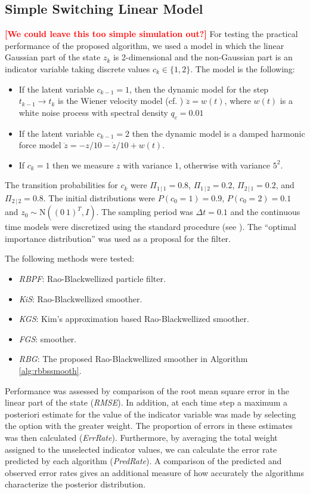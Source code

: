 \documentclass[twocolumn]{autart}    %
\newcommand{\comment}[1]{\textcolor{red}{\textbf{[#1]}}}
\begin{document}
\subsection{Simple Switching Linear Model}
%
\comment{We could leave this too simple simulation out?}
For testing the practical performance of the proposed algorithm, we
used a model in which the linear Gaussian part of the state $z_k$ is
2-dimensional and the non-Gaussian part is an indicator variable taking
discrete values $c_k \in\{1,2\}$. The model is the following:
%
\begin{itemize}
\item If the latent variable $c_{k-1} = 1$, then the dynamic model for
  the step $t_{k-1} \rightarrow t_k$ is the Wiener velocity model
  (cf. \cite{Bar-Shalom+Li+Kirubarajan:2001}) $\ddot{z} = w(t)$,
  where $w(t)$ is a white noise process with spectral density $q_c =
  0.01$
\item If the latent variable $c_{k-1} = 2$ then the dynamic model
  is a damped harmonic force model $\ddot{z} = -z/10 - \dot{z}/10 + w(t)$.
\item If $c_k = 1$ then we measure $z$ with variance $1$, otherwise
  with variance $5^2$.
\end{itemize}
%
The transition probabilities for $c_k$ were $\Pi_{1\,|\,1} = 0.8$,
$\Pi_{1\,|\,2} = 0.2$, $\Pi_{2\,|\,1} = 0.2$, and $\Pi_{2\,|\,2} =
0.8$. The initial distributions were $P(c_0=1) = 0.9$, $P(c_0=2) =
0.1$ and $z_0 \sim \mathrm{N}((0~1)^T,I)$. The sampling period was
$\Delta t = 0.1$ and the continuous time models were discretized using
the standard procedure (see \cite{Bar-Shalom+Li+Kirubarajan:2001}).
The ``optimal importance distribution''
\cite{Doucet+Godsill+Andrieu:2000} was used as a proposal for the
filter.

The following methods were tested:
%
\begin{itemize}
\item {\em RBPF}: Rao-Blackwellized particle filter.
\item {\em KiS}: Rao-Blackwellized \cite{Kitagawa:1996} smoother.
\item {\em KGS}: Kim's approximation based Rao-Blackwellized
  \cite{Godsill+Doucet+West:2004} smoother.
\item {\em FGS}: \cite{Fong+Godsill+Doucet+West:2002} smoother.
\item {\em RBG}: The proposed Rao-Blackwellized
  \cite{Godsill+Doucet+West:2004} smoother in Algorithm
  \ref{alg:rbbssmooth}.
\end{itemize}
%
Performance was assessed by comparison of the root mean square error
in the linear part of the state ({\em RMSE}). In addition, at each
time step a maximum a posteriori estimate for the value of the
indicator variable was made by selecting the option with the greater
weight. The proportion of errors in these estimates was then
calculated ({\em ErrRate}). Furthermore, by averaging the total weight
assigned to the unselected indicator values, we can calculate the
error rate predicted by each algorithm ({\em PredRate}). A comparison
of the predicted and observed error rates gives an additional measure
of how accurately the algorithms characterize the posterior
distribution.
\end{document}
